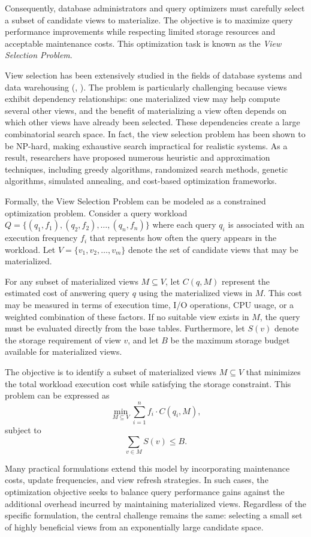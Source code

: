 Consequently, database administrators and query optimizers must carefully select a subset of candidate views to materialize. The objective is to maximize query performance improvements while respecting limited storage resources and acceptable maintenance costs. This optimization task is known as the \emph{View Selection Problem}.

View selection has been extensively studied in the fields of database systems and data warehousing (\textcite{mami2012survey}, \textcite{gosain2017systematic}). The problem is particularly challenging because views exhibit dependency relationships: one materialized view may help compute several other views, and the benefit of materializing a view often depends on which other views have already been selected. These dependencies create a large combinatorial search space. In fact, the view selection problem has been shown to be NP-hard, making exhaustive search impractical for realistic systems. As a result, researchers have proposed numerous heuristic and approximation techniques, including greedy algorithms, randomized search methods, genetic algorithms, simulated annealing, and cost-based optimization frameworks.

Formally, the View Selection Problem can be modeled as a constrained optimization problem. Consider a query workload $Q = \{(q_1,f_1), (q_2,f_2), \dots, (q_n,f_n)\}$ where each query $q_i$ is associated with an execution frequency $f_i$ that represents how often the query appears in the workload. Let $V = \{v_1, v_2, \dots, v_m\}$ denote the set of candidate views that may be materialized.

For any subset of materialized views $M \subseteq V$, let $C(q, M)$ represent the estimated cost of answering query $q$ using the materialized views in $M$. This cost may be measured in terms of execution time, I/O operations, CPU usage, or a weighted combination of these factors. If no suitable view exists in $M$, the query must be evaluated directly from the base tables. Furthermore, let $S(v)$ denote the storage requirement of view $v$, and let $B$ be the maximum storage budget available for materialized views.

The objective is to identify a subset of materialized views $M \subseteq V$ that minimizes the total workload execution cost while satisfying the storage constraint. This problem can be expressed as
\[
\min_{M \subseteq V}
\sum_{i=1}^{n}
f_i \cdot C(q_i, M),
\]
subject to
\[
\sum_{v \in M} S(v) \le B.
\]

Many practical formulations extend this model by incorporating maintenance costs, update frequencies, and view refresh strategies. In such cases, the optimization objective seeks to balance query performance gains against the additional overhead incurred by maintaining materialized views. Regardless of the specific formulation, the central challenge remains the same: selecting a small set of highly beneficial views from an exponentially large candidate space.

